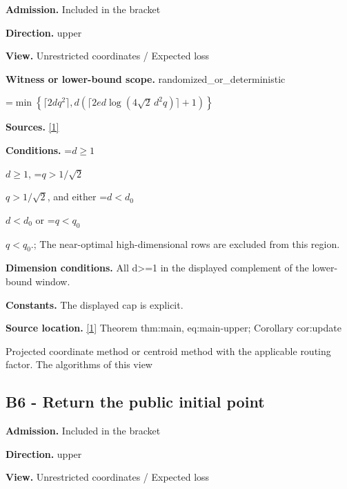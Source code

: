 \documentclass[10pt,a4paper]{article}
\newcommand{\AtlasMath}[1]{\par\begingroup\centering\setbox0=\hbox{$\displaystyle #1$}\ifdim\wd0>1.4\linewidth\typeout{ATLAS WIDE FORMULA: \the\wd0}\fi\ifdim\wd0>\linewidth\resizebox{\linewidth}{!}{\box0}\else\box0\fi\par\endgroup}
\newcommand{\AtlasInlineMath}[1]{\begingroup\setbox0=\hbox{$#1$}\ifdim\wd0>.4\linewidth\endgroup\AtlasMath{#1}\else\endgroup$#1$\fi}
\begin{document}
\textbf{Admission.} Included in the bracket



\textbf{Direction.} upper



\textbf{View.} Unrestricted coordinates / Expected loss



\textbf{Witness or lower-bound scope.} randomized\_or\_deterministic



\AtlasMath{\min\left\{\lceil2dq^2\rceil,d\left(\lceil2ed\log(4\sqrt2\,d^2q)\rceil+1\right)\right\}}


\textbf{Sources.} \href{https://github.com/WU-Wendao/Colombo/blob/main/colombo_sensorium/Complexity_altas/data/sources/colombo/U03/manuscript.pdf}{[1]}



\textbf{Conditions.} \AtlasInlineMath{d\ge1}, \AtlasInlineMath{q>1/\sqrt2}, and either \AtlasInlineMath{d<d_0} or \AtlasInlineMath{q<q_0}.; The near-optimal high-dimensional rows are excluded from this region.



\textbf{Dimension conditions.} All d>=1 in the displayed complement of the lower-bound window.



\textbf{Constants.} The displayed cap is explicit.



\textbf{Source location.} \href{https://github.com/WU-Wendao/Colombo/blob/main/colombo_sensorium/Complexity_altas/data/sources/colombo/U03/manuscript.pdf}{[1]} Theorem thm:main, eq:main-upper; Corollary cor:update



Projected coordinate method or centroid method with the applicable routing factor. The algorithms of this view



\subsection{B6 - Return the public initial point}


\textbf{Admission.} Included in the bracket



\textbf{Direction.} upper



\textbf{View.} Unrestricted coordinates / Expected loss
\end{document}
